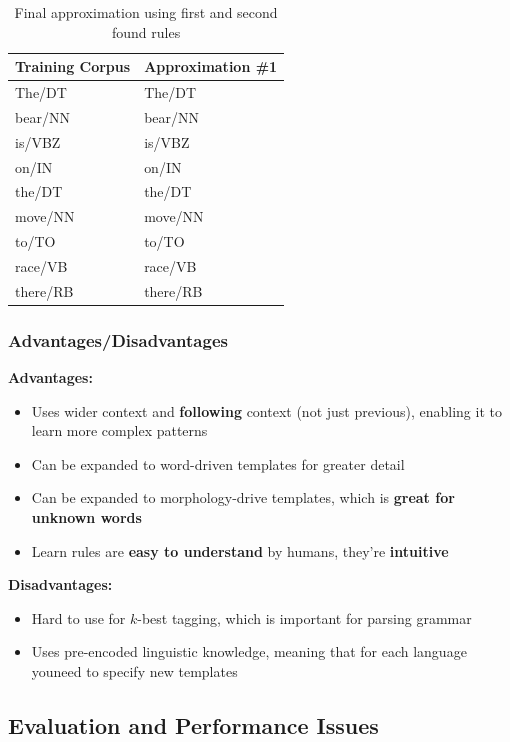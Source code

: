 \documentclass{article}
\begin{document}
\begin{table}[H]
	\centering
	\begin{tabular}{|l|l|}
		\hline
		\textbf{Training Corpus} & \textbf{Approximation \#1} \\
		\hline
		The/DT & The/DT \\
		bear/NN & bear/NN \\
		is/VBZ & is/VBZ \\
		on/IN & on/IN \\
		the/DT & the/DT \\
		move/NN & move/NN \\
		to/TO & to/TO \\
		race/VB & race/VB \\
		there/RB & there/RB \\
		\hline
	\end{tabular}
	\caption{Final approximation using first and second found rules}
	\label{tab:transformation-tagger-example3}
\end{table}


\subsubsection{Advantages/Disadvantages}

\textbf{Advantages:}
\begin{itemize}
	\item Uses wider context and \textbf{following} context (not just previous), enabling it to learn more complex patterns
	\item Can be expanded to word-driven templates for greater detail
	\item Can be expanded to morphology-drive templates, which is \textbf{great for unknown words}
	\item Learn rules are \textbf{easy to understand} by humans, they're \textbf{intuitive}
\end{itemize}

\textbf{Disadvantages:}
\begin{itemize}
	\item Hard to use for $k$-best tagging, which is important for parsing grammar
	\item Uses pre-encoded linguistic knowledge, meaning that for each language youneed to specify new templates
\end{itemize}

\subsection{Evaluation and Performance Issues}
\end{document}
